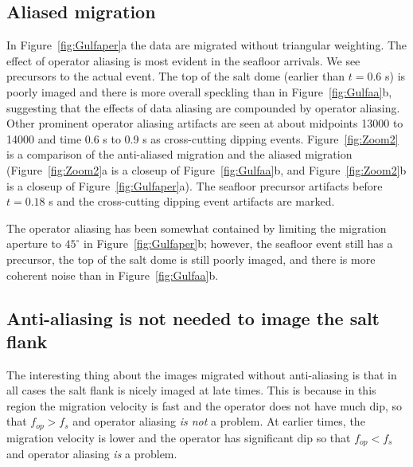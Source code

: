 
\subsection{Aliased migration}
In Figure~\ref{fig:Gulfaper}a the data are migrated without triangular weighting.
The effect of operator aliasing is most evident in the seafloor arrivals.
We see precursors to the actual event. The top of 
the salt dome (earlier than $t = 0.6$ s) is poorly imaged and there is more
overall speckling than in Figure~\ref{fig:Gulfaa}b, suggesting that
the effects of data aliasing are compounded by operator aliasing.
Other prominent operator aliasing artifacts are seen at about
midpoints 13000 to 14000 and time 0.6 s to 0.9 s as cross-cutting dipping
events.  
Figure~\ref{fig:Zoom2} is a comparison of the anti-aliased 
migration and the aliased migration 
(Figure~\ref{fig:Zoom2}a is a closeup of Figure~\ref{fig:Gulfaa}b, and
Figure~\ref{fig:Zoom2}b is a closeup of Figure~\ref{fig:Gulfaper}a).
The seafloor precursor artifacts before $t=0.18$ s and the cross-cutting 
dipping event artifacts are marked.

The operator aliasing has been somewhat contained by limiting the
migration aperture to $45^\circ$ in Figure~\ref{fig:Gulfaper}b;
however, the seafloor event still has
a precursor, the top of the salt dome is still poorly imaged, and there 
is more coherent noise than in Figure~\ref{fig:Gulfaa}b.



\subsection{Anti-aliasing is not needed to image the salt flank}
The interesting thing about the images migrated without
anti-aliasing is that in all cases the 
salt flank is nicely imaged at late times. This is because in this region
the migration velocity is fast and the operator does not have much dip, so
that $f_{op} > f_s$ and operator aliasing {\it is not} a problem.  
At earlier times, the migration velocity is lower and the operator has
significant dip so that $f_{op} < f_s$ and operator aliasing {\it is} a problem.

